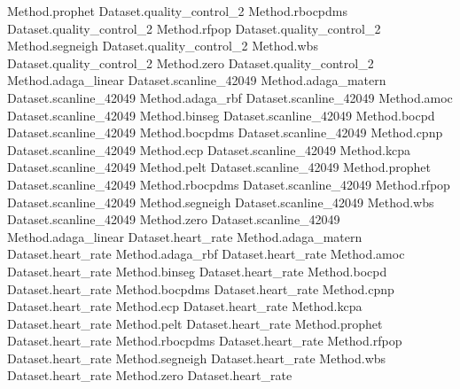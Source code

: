 Method.prophet Dataset.quality_control_2
Method.rbocpdms Dataset.quality_control_2
Method.rfpop Dataset.quality_control_2
Method.segneigh Dataset.quality_control_2
Method.wbs Dataset.quality_control_2
Method.zero Dataset.quality_control_2
Method.adaga_linear Dataset.scanline_42049
Method.adaga_matern Dataset.scanline_42049
Method.adaga_rbf Dataset.scanline_42049
Method.amoc Dataset.scanline_42049
Method.binseg Dataset.scanline_42049
Method.bocpd Dataset.scanline_42049
Method.bocpdms Dataset.scanline_42049
Method.cpnp Dataset.scanline_42049
Method.ecp Dataset.scanline_42049
Method.kcpa Dataset.scanline_42049
Method.pelt Dataset.scanline_42049
Method.prophet Dataset.scanline_42049
Method.rbocpdms Dataset.scanline_42049
Method.rfpop Dataset.scanline_42049
Method.segneigh Dataset.scanline_42049
Method.wbs Dataset.scanline_42049
Method.zero Dataset.scanline_42049
Method.adaga_linear Dataset.heart_rate
Method.adaga_matern Dataset.heart_rate
Method.adaga_rbf Dataset.heart_rate
Method.amoc Dataset.heart_rate
Method.binseg Dataset.heart_rate
Method.bocpd Dataset.heart_rate
Method.bocpdms Dataset.heart_rate
Method.cpnp Dataset.heart_rate
Method.ecp Dataset.heart_rate
Method.kcpa Dataset.heart_rate
Method.pelt Dataset.heart_rate
Method.prophet Dataset.heart_rate
Method.rbocpdms Dataset.heart_rate
Method.rfpop Dataset.heart_rate
Method.segneigh Dataset.heart_rate
Method.wbs Dataset.heart_rate
Method.zero Dataset.heart_rate
